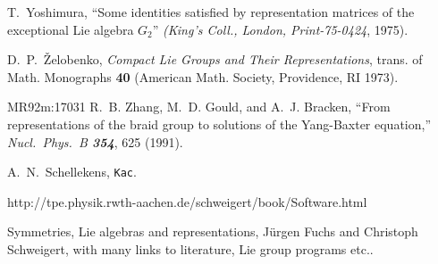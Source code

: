 


 T.~Yoshimura, %
``Some identities satisfied by representation matrices of the
exceptional Lie algebra $G_2$'' %
{\em (King's Coll., London, Print-75-0424}, 1975).






 D.~P.~\v{Z}elobenko,
{\em Compact Lie Groups and Their Representations},
trans. of Math. Monographs {\bf 40}
(American Math. Society, Providence, RI 1973).

        {MR92m:17031}
R.~B. Zhang, M.~D. Gould, and A.~J. Bracken,
``From representations of
  the braid group to solutions of the Yang-Baxter equation,''
{\em Nucl.~Phys.~B  \bf 354}, 625 (1991).   %




A.~N.~Schellekens,
    {\tt Kac}.

http://tpe.physik.rwth-aachen.de/schweigert/book/Software.html

 Symmetries, Lie algebras and representations,
    J{\"u}rgen Fuchs and Christoph Schweigert, with many links to literature, Lie group programs etc..

